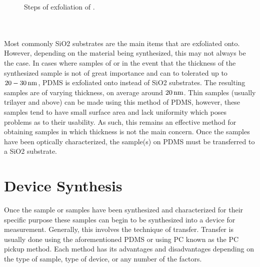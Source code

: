 \begin{figure}[ht]
	\centering
	\qquad
	\qquad
	\caption[Exfoliation steps]{Steps of exfoliation of .}
	\label{fig:exfoliation_steps}
\end{figure}
\\ \\
\noindent Most commonly \acs{SiO2} substrates are the main items that are exfoliated onto. However, depending on the material being synthesized, this may not always be the case. In cases where samples of \hbn or in the event that the thickness of the synthesized sample is not of great importance and can to tolerated up to $20-30\,\mathrm{nm}$, \ac{PDMS} is exfoliated onto instead of \acs{SiO2} substrates. The resulting samples are of varying thickness, on average around $20\,\mathrm{nm}$. Thin samples (usually trilayer and above) can be made using this method of \acs{PDMS}, however, these samples tend to have small surface area and lack uniformity which poses problems as to their usability. As such, this remains an effective method for obtaining samples in which thickness is not the main concern. Once the samples have been optically characterized, the sample(s) on \acs{PDMS} must be transferred to a \acs{SiO2} substrate.

\section{Device Synthesis}\label{sec:synthesis}
Once the sample or samples have been synthesized and characterized for their specific purpose these samples can begin to be synthesized into a device for measurement. Generally, this involves the technique of transfer. Transfer is usually done using the aforementioned \acs{PDMS} or using \ac{PC} known as the \acs{PC} pickup method. Each method has its advantages and disadvantages depending on the type of sample, type of device, or any number of the factors.
%
